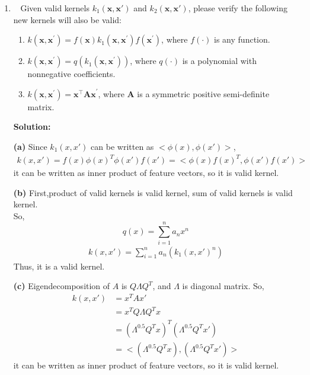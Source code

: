 \documentclass[10pt]{article}
\begin{document}
\begin{enumerate}
			\newpage

	\item ~
	      Given valid kernels $k_1(\mathbf{x}, \mathbf{x}')$ and $k_2(\mathbf{x}, \mathbf{x}')$, please verify the following new kernels will also be valid:
	      \begin{enumerate}
		      \item $k\left(\mathbf{x}, \mathbf{x}^{\prime}\right)=f(\mathbf{x}) k_{1}\left(\mathbf{x}, \mathbf{x}^{\prime}\right) f\left(\mathbf{x}^{\prime}\right)$, where $f(\cdot)$ is any function. ~
		      \item $k(\mathbf{x}, \mathbf{x}^\prime) = q(k_1(\mathbf{x}, \mathbf{x}^\prime))$, where $q(\cdot)$ is a polynomial with nonnegative coefficients. ~
		      \item $k(\mathbf{x}, \mathbf{x}^\prime) = \mathbf{x^\top}\mathbf{Ax}^\prime$, where $\mathbf{A}$ is a symmetric positive semi-definite matrix.~
	      \end{enumerate}
\textbf{Solution:}
		  \item[\textbf{(a)}]
			Since $k_1(x,x')$ can be written as $<\phi(x),\phi(x')>$,
				$$
				\begin{aligned}
					k(x,x')=f(x)\phi(x)^T\phi(x')f(x')=<\phi(x)f(x)^T,\phi(x')f(x')>
				\end{aligned}
				$$
			it can be written as inner product of feature vectors, so it is valid kernel.
		  \item[\textbf{(b)}]
			  First,product of valid kernels is valid kernel, sum of valid kernels is valid kernel.
			  \\So,$$q(x)=\sum_{i=1}^n a_n x^n$$
			  $$
				\begin{aligned}
					k(x,x')=\sum_{i=1}^n a_n (k_1(x,x')^n)
				\end{aligned}
			  $$
			  Thus, it is a valid kernel.
		  \item[\textbf{(c)}]
			Eigendecomposition of $A$ is $Q\Lambda Q^T$, and  $\Lambda$ is diagonal matrix.
			So,
			$$
				\begin{aligned}
					k(x,x')&=x^T A x'
					\\&= x^T Q\Lambda Q^T x
					\\&=(\Lambda^{0.5}Q^Tx)^T(\Lambda^{0.5}Q^Tx')
					\\&=<(\Lambda^{0.5}Q^Tx),(\Lambda^{0.5}Q^Tx')>
				\end{aligned}
			$$ 
			it can be written as inner product of feature vectors, so it is valid kernel.
	      \newpage


\end{enumerate}
\end{document}
